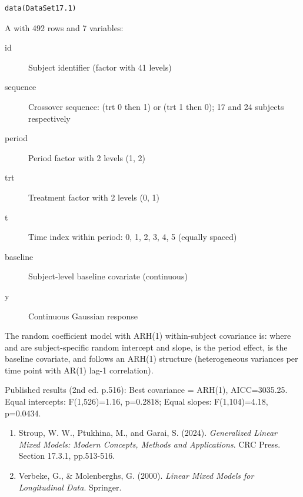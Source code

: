 \documentclass[a4paper]{book}
\begin{document}
%
\begin{Usage}
\begin{verbatim}
data(DataSet17.1)
\end{verbatim}
\end{Usage}
%
\begin{Format}
A  with 492 rows and 7 variables:
\begin{description}

\item[id] Subject identifier (factor with 41 levels)
\item[sequence] Crossover sequence:  (trt 0 then 1) or
 (trt 1 then 0); 17 and 24 subjects respectively
\item[period] Period factor with 2 levels (1, 2)
\item[trt] Treatment factor with 2 levels (0, 1)
\item[t] Time index within period: 0, 1, 2, 3, 4, 5 (equally spaced)
\item[baseline] Subject-level baseline covariate (continuous)
\item[y] Continuous Gaussian response

\end{description}

\end{Format}
%
\begin{Details}
The random coefficient model with ARH(1) within-subject covariance is:
where  and  are subject-specific random
intercept and slope,  is the period effect,  is
the baseline covariate, and  follows an ARH(1) structure
(heterogeneous variances per time point with AR(1) lag-1 correlation).

Published results (2nd ed. p.516):
Best covariance = ARH(1), AICC=3035.25.
Equal intercepts: F(1,526)=1.16, p=0.2818;
Equal slopes: F(1,104)=4.18, p=0.0434.
\end{Details}
%
\begin{References}
\begin{enumerate}

\item{} Stroup, W. W., Ptukhina, M., and Garai, S. (2024).
\emph{Generalized Linear Mixed Models: Modern Concepts,
Methods and Applications}. CRC Press. Section 17.3.1, pp.513-516.
\item{} Verbeke, G., \& Molenberghs, G. (2000).
\emph{Linear Mixed Models for Longitudinal Data}. Springer.

\end{enumerate}

\end{References}
\end{document}
